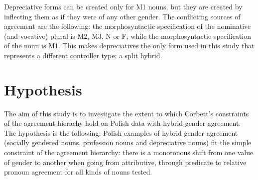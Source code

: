 Depreciative forms can be created only for M1 nouns, but they are created by inflecting them as if they were of any other gender. The conflicting sources of agreement are the following: the morphosyntactic specification of the nominative (and vocative) plural is M2, M3, N or F, while the morphosyntactic specification of the noun is M1. This makes depreciatives the only form used in this study that represents a different controller type: a split hybrid.

\section{Hypothesis}
The aim of this study is to investigate the extent to which Corbett's constraints of the agreement hierachy hold on Polish data with hybrid gender agreement. The hypothesis is the following: Polish examples of hybrid gender agreement (socially gendered nouns, profession nouns and depreciative nouns) fit the simple constraint of the agreement hierarchy: there is a monotonous shift from one value of gender to another when going from attributive, through predicate to relative pronoun agreement for all kinds of nouns tested.
